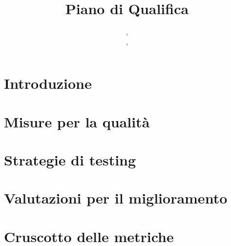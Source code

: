 \documentclass{classes/base}
\title{Piano di Qualifica}
\author{\marcob, \\ \ruth, \\ \matteo}
\begin{document}
	\maketitle
	\newpage
	
	\newpage
	\tableofcontents
	\newpage
	\listoftables
	\newpage
	\listoffigures
	
	\newpage
	\section{Introduzione}
	
	
    \newpage
	\section{Misure per la qualità}
	
	
	\newpage
	\section{Strategie di testing}
	
	
	\newpage
	\section{Valutazioni per il miglioramento}
	
	
	\newpage
	\section{Cruscotto delle metriche}
	
\end{document}
